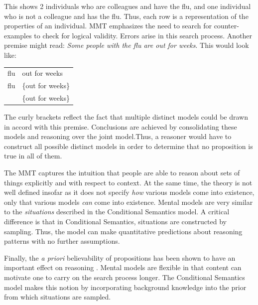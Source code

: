 \documentclass[10pt,letterpaper]{article}
\begin{document}
This shows 2 individuals who are colleagues and have the flu, and one individual who is not a colleague and has the flu. Thus, each row is a representation of the properties of an individual. MMT emphasizes the need to search for counter-examples to check for logical validity. Errors arise in this search process. Another premise might read: \emph{Some people with the flu are out for weeks}. This would look like:

\begin{tabular}{l l}
flu & out for weeks\\
flu & \{out for weeks\}\\
 & \{out for weeks\}\\
\end{tabular}

The curly brackets reflect the fact that multiple distinct models could be drawn in accord with this premise. Conclusions are achieved by consolidating these models and reasoning over the joint model.Thus, a reasoner would have to construct all possible distinct models in order to determine that no proposition is true in all of them. 

The MMT captures the intuition that people are able to reason about sets of things explicitly and with respect to context. At the same time, the theory is not well defined insofar as it does not specify \emph{how} various models come into existence, only that various models \emph{can} come into existence. Mental models are very similar to the \emph{situations} described in the Conditional Semantics model. A critical difference is that in Conditional Semantics, situations are constructed by sampling. Thus, the model can make quantitative predictions about reasoning patterns with no further assumptions. 

Finally, the \emph{a priori} believability of propositions has been shown to have an important effect on reasoning \cite{Oakhill1989}. Mental models are flexible in that content can motivate one to carry on the search process longer. The Conditional Semantics model makes this notion by incorporating background knowledge into the prior from which situations are sampled. 

\end{document}
